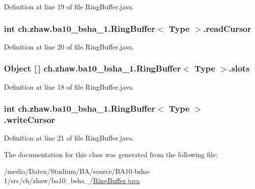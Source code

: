 Definition at line 19 of file RingBuffer.java.\hypertarget{classch_1_1zhaw_1_1ba10__bsha__1_1_1RingBuffer_3_01Type_01_4_a92cc08d7afa1de0617a23432c047eb36}{
\subsubsection[{readCursor}]{\setlength{\rightskip}{0pt plus 5cm}int ch.zhaw.ba10\_\-bsha\_\-1.RingBuffer$<$ Type $>$.{\bf readCursor}}}
\label{classch_1_1zhaw_1_1ba10__bsha__1_1_1RingBuffer_3_01Type_01_4_a92cc08d7afa1de0617a23432c047eb36}


Definition at line 20 of file RingBuffer.java.\hypertarget{classch_1_1zhaw_1_1ba10__bsha__1_1_1RingBuffer_3_01Type_01_4_a0f05e508eb82500d1f00fb0a13fee154}{
\subsubsection[{slots}]{\setlength{\rightskip}{0pt plus 5cm}Object \mbox{[}$\,$\mbox{]} ch.zhaw.ba10\_\-bsha\_\-1.RingBuffer$<$ Type $>$.{\bf slots}}}
\label{classch_1_1zhaw_1_1ba10__bsha__1_1_1RingBuffer_3_01Type_01_4_a0f05e508eb82500d1f00fb0a13fee154}


Definition at line 18 of file RingBuffer.java.\hypertarget{classch_1_1zhaw_1_1ba10__bsha__1_1_1RingBuffer_3_01Type_01_4_aecc4ed40393c864568b0806a6349de11}{
\subsubsection[{writeCursor}]{\setlength{\rightskip}{0pt plus 5cm}int ch.zhaw.ba10\_\-bsha\_\-1.RingBuffer$<$ Type $>$.{\bf writeCursor}}}
\label{classch_1_1zhaw_1_1ba10__bsha__1_1_1RingBuffer_3_01Type_01_4_aecc4ed40393c864568b0806a6349de11}


Definition at line 21 of file RingBuffer.java.

The documentation for this class was generated from the following file:\begin{DoxyCompactItemize}
\item 
/media/Daten/Studium/BA/source/BA10-\/bsha-\/1/src/ch/zhaw/ba10\_\-bsha\_/\hyperlink{RingBuffer_8java}{RingBuffer.java}\end{DoxyCompactItemize}
